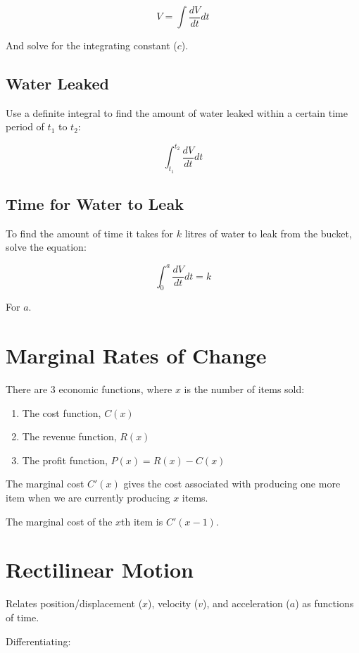 \documentclass[a4paper,11pt]{article}
\begin{document}
$$
V = \int \frac{dV}{dt} dt
$$

And solve for the integrating constant ($c$).


\subsection{Water Leaked}

Use a definite integral to find the amount of water leaked within a certain
time period of $t_1$ to $t_2$:

$$
\int_{t_1}^{t_2} \frac{dV}{dt} dt
$$


\subsection{Time for Water to Leak}

To find the amount of time it takes for $k$ litres of water to leak from the
bucket, solve the equation:

$$
\int_0^a \frac{dV}{dt} dt = k
$$

For $a$.




\section{Marginal Rates of Change}

There are 3 economic functions, where $x$ is the number of items sold:

\begin{enumerate}
\item The cost function, $C(x)$
\item The revenue function, $R(x)$
\item The profit function, $P(x) = R(x) - C(x)$
\end{enumerate}

The marginal cost $C'(x)$ gives the cost associated with producing one more
item when we are currently producing $x$ items.

The marginal cost of the $x$th item is $C'(x - 1)$.




\section{Rectilinear Motion}

Relates position/displacement ($x$), velocity ($v$), and acceleration ($a$) as
functions of time.

Differentiating:
\end{document}
